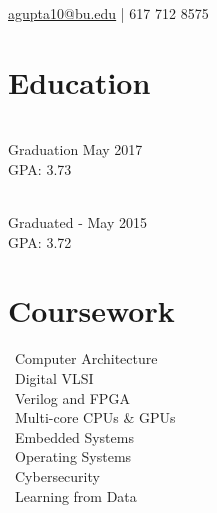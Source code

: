 \documentclass[]{deedy_format_Anmol}
\begin{document}
%
%
\lastupdated

%
%


{\href{mailto:agupta10@bu.edu}{agupta10@bu.edu} | 617 712 8575
}

%
%

\begin{minipage}[t]{0.325\textwidth} 


\section{Education} 
\vspace{0.5mm} %
\\
Graduation May 2017 \\ GPA: 3.73
\sectionsep

\\		
Graduated - May 2015 \\ GPA: 3.72
\sectionsep

\sectionsep

\section{Coursework}
\vspace{0.5mm} %
\flushleft
\textbullet \, Computer Architecture\\
\textbullet \, Digital VLSI \\
\textbullet \, Verilog and FPGA\\
\textbullet \, Multi-core CPUs \& GPUs\\
\textbullet \, Embedded Systems\\
\textbullet \, Operating Systems\\
\textbullet \, Cybersecurity\\
\textbullet \, Learning from Data
\sectionsep



\end{minipage}
\end{document}
